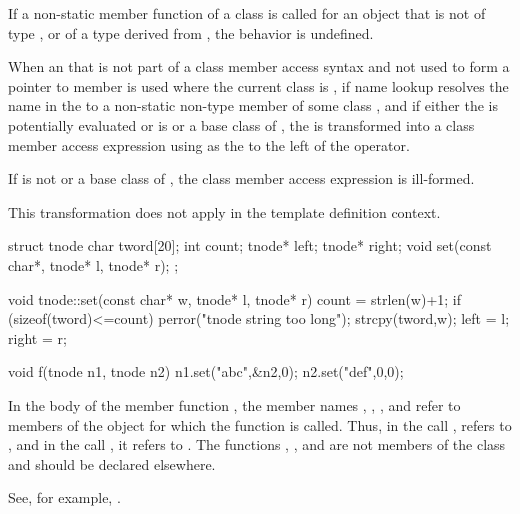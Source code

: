 \pnum
{}%
If a non-static member function of a class  is called for an
object that is not of type , or of a type derived from
, the behavior is undefined.

\pnum
When an  that is not part of a
class member access syntax and not used to form a
pointer to member is used
where the current class is ,
if name
lookup resolves the name in the
 to a non-static non-type member of some class
,
and if either the  is potentially evaluated or
 is  or a base class of ,
the  is transformed into a class
member access expression using
 as the 
to the left of the  operator.
\begin{note}
If  is not  or a base class of , the class
member access expression is ill-formed.
\end{note}
This transformation does not apply in the
template definition context.
\begin{example}
\begin{codeblock}
struct tnode {
  char tword[20];
  int count;
  tnode* left;
  tnode* right;
  void set(const char*, tnode* l, tnode* r);
};

void tnode::set(const char* w, tnode* l, tnode* r) {
  count = strlen(w)+1;
  if (sizeof(tword)<=count)
      perror("tnode string too long");
  strcpy(tword,w);
  left = l;
  right = r;
}

void f(tnode n1, tnode n2) {
  n1.set("abc",&n2,0);
  n2.set("def",0,0);
}
\end{codeblock}

In the body of the member function , the member names
, , , and  refer to
members of the object for which the function is called. Thus, in the
call ,  refers to
, and in the call , it refers
to . The functions , , and
 are not members of the class  and should be
declared elsewhere.
\begin{footnote}
See, for example, .
\end{footnote}
\end{example}

